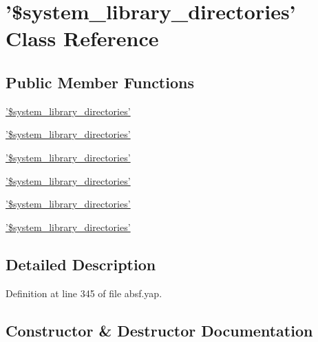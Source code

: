 \section{'\$system\+\_\+library\+\_\+directories' Class Reference}
\label{class'_0Bsystem__library__directories'}
\subsection*{Public Member Functions}
\begin{DoxyCompactItemize}
\item 
\hyperlink{class'_0Bsystem__library__directories'_a2b9310575b8bfc86a8e7ef18516ce5c1}{'\$system\+\_\+library\+\_\+directories'}
\item 
\hyperlink{class'_0Bsystem__library__directories'_a2b9310575b8bfc86a8e7ef18516ce5c1}{'\$system\+\_\+library\+\_\+directories'}
\item 
\hyperlink{class'_0Bsystem__library__directories'_a2b9310575b8bfc86a8e7ef18516ce5c1}{'\$system\+\_\+library\+\_\+directories'}
\item 
\hyperlink{class'_0Bsystem__library__directories'_a2b9310575b8bfc86a8e7ef18516ce5c1}{'\$system\+\_\+library\+\_\+directories'}
\item 
\hyperlink{class'_0Bsystem__library__directories'_a2b9310575b8bfc86a8e7ef18516ce5c1}{'\$system\+\_\+library\+\_\+directories'}
\item 
\hyperlink{class'_0Bsystem__library__directories'_a2b9310575b8bfc86a8e7ef18516ce5c1}{'\$system\+\_\+library\+\_\+directories'}
\end{DoxyCompactItemize}


\subsection{Detailed Description}


Definition at line 345 of file absf.\+yap.



\subsection{Constructor \& Destructor Documentation}

